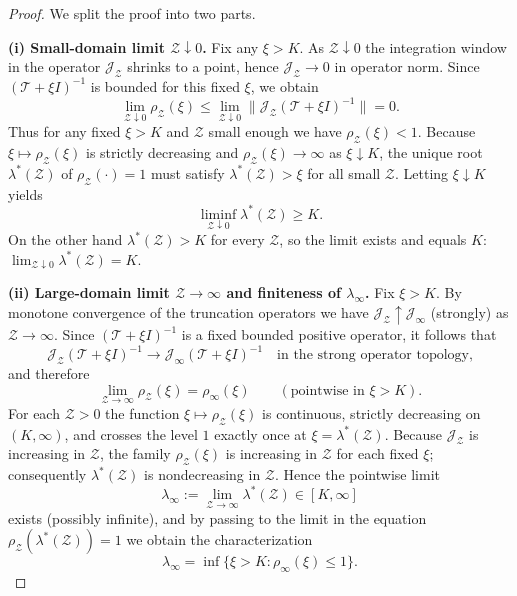 \documentclass[a4paper,11pt]{amsart}
\theoremstyle{definition}
\numberwithin{equation}{section}
\theoremstyle{definition}
\begin{document}
\begin{proof}
We split the proof into two parts.

\medskip\noindent\textbf{(i) Small-domain limit \(\mathcal Z\downarrow0\).}
Fix any \(\xi>K\). As \(\mathcal Z\downarrow0\) the integration window in the operator \(\mathscr J_{\mathcal Z}\) shrinks to a point, hence \(\mathscr J_{\mathcal Z}\to 0\) in operator norm. Since \((\mathscr T+\xi I)^{-1}\) is bounded for this fixed \(\xi\), we obtain
\[
\lim_{\mathcal Z\downarrow0}\rho_{\mathcal Z}(\xi)
\le \lim_{\mathcal Z\downarrow0}\big\|\mathscr J_{\mathcal Z}(\mathscr T+\xi I)^{-1}\big\|
=0.
\]
Thus for any fixed \(\xi>K\) and \(\mathcal Z\) small enough we have \(\rho_{\mathcal Z}(\xi)<1\). Because \(\xi\mapsto\rho_{\mathcal Z}(\xi)\) is strictly decreasing and
\(\rho_{\mathcal Z}(\xi)\to\infty\) as \(\xi\downarrow K\), the unique root \(\lambda^\ast(\mathcal Z)\) of \(\rho_{\mathcal Z}(\cdot)=1\) must satisfy \(\lambda^\ast(\mathcal Z)>\xi\) for all small \(\mathcal Z\). Letting \(\xi\downarrow K\) yields
\[
\liminf_{\mathcal Z\downarrow0}\lambda^\ast(\mathcal Z)\ge K.
\]
On the other hand \(\lambda^\ast(\mathcal Z)>K\) for every \(\mathcal Z\), so the limit exists and equals \(K\):
\(\displaystyle\lim_{\mathcal Z\downarrow0}\lambda^\ast(\mathcal Z)=K\).

\medskip\noindent\textbf{(ii) Large-domain limit \(\mathcal Z\to\infty\) and finiteness of \(\lambda_\infty\).}
Fix \(\xi>K\). By monotone convergence of the truncation operators we have \(\mathscr J_{\mathcal Z}\uparrow \mathscr J_\infty\) (strongly) as \(\mathcal Z\to\infty\). Since \((\mathscr T+\xi I)^{-1}\) is a fixed bounded positive operator, it follows that
\[
\mathscr J_{\mathcal Z}(\mathscr T+\xi I)^{-1} \longrightarrow \mathscr J_\infty(\mathscr T+\xi I)^{-1}
\quad\text{in the strong operator topology,}
\]
and therefore
\[
\lim_{\mathcal Z\to\infty}\rho_{\mathcal Z}(\xi)=\rho_\infty(\xi)\qquad(\text{pointwise in }\xi>K).
\]
For each \(\mathcal Z>0\) the function \(\xi\mapsto\rho_{\mathcal Z}(\xi)\) is continuous, strictly decreasing on \((K,\infty)\), and crosses the level \(1\) exactly once at \(\xi=\lambda^\ast(\mathcal Z)\). Because \(\mathscr J_{\mathcal Z}\) is increasing in \(\mathcal Z\), the family \(\rho_{\mathcal Z}(\xi)\) is increasing in \(\mathcal Z\) for each fixed \(\xi\); consequently \(\lambda^\ast(\mathcal Z)\) is nondecreasing in \(\mathcal Z\). Hence the pointwise limit
\[
\lambda_\infty:=\lim_{\mathcal Z\to\infty}\lambda^\ast(\mathcal Z)\in[K,\infty]
\]
exists (possibly infinite), and by passing to the limit in the equation \(\rho_{\mathcal Z}(\lambda^\ast(\mathcal Z))=1\) we obtain the characterization
\[
\lambda_\infty = \inf\{\xi>K:\rho_\infty(\xi)\le1\}.
\]


\end{proof}
\end{document}
